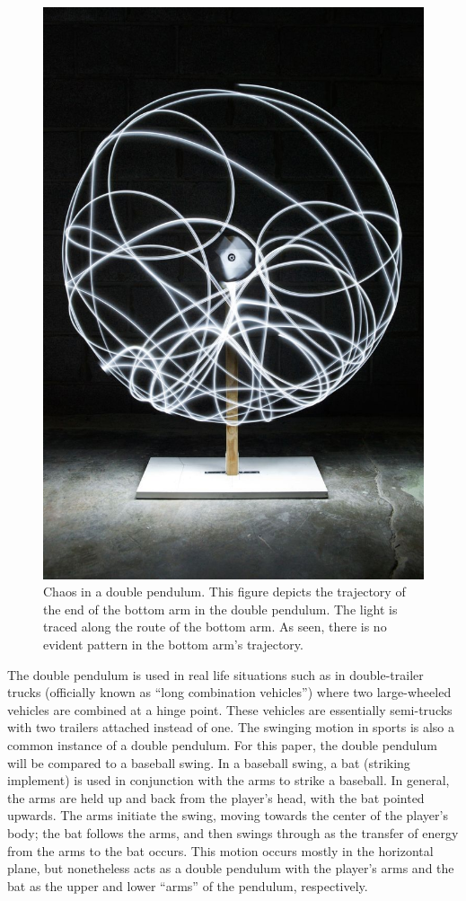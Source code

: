 \documentclass[%
 aip,
 amsmath,amssymb,
 reprint,%
 floatfix,%
]{revtex4-1}
\begin{document}
\begin{figure}
	\centering
	\includegraphics[scale=0.25]{lights.jpg}
	\caption{Chaos in a double pendulum. This figure depicts the trajectory of the end of the bottom arm in the double pendulum. The light is traced along the route of the bottom arm. As seen, there is no evident pattern in the bottom arm's trajectory.}
\end{figure}

The double pendulum is used in real life situations such as in double-trailer trucks (officially known as “long combination vehicles”) where two large-wheeled vehicles are combined at a hinge point. These vehicles are essentially semi-trucks with two trailers attached instead of one. The swinging motion in sports is also a common instance of a double pendulum. For this paper, the double pendulum will be compared to a baseball swing. In a baseball swing, a bat (striking implement) is used in conjunction with the arms to strike a baseball. In general, the arms are held up and back from the player's head, with the bat pointed upwards. The arms initiate the swing, moving towards the center of the player's body; the bat follows the arms, and then swings through as the transfer of energy from the arms to the bat occurs. This motion occurs mostly in the horizontal plane, but nonetheless acts as a double pendulum with the player's arms and the bat as the upper and lower “arms” of the pendulum, respectively.
\end{document}
